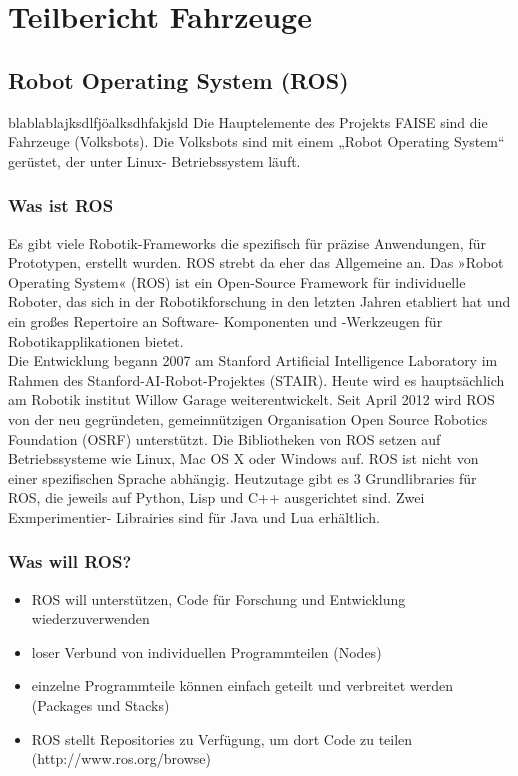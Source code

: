 \section{Teilbericht Fahrzeuge}
\subsection{Robot Operating System (ROS)}
blablablajksdlfjöalksdhfakjsld
Die Hauptelemente des Projekts FAISE sind die Fahrzeuge (Volksbots). Die Volksbots sind
mit einem „Robot Operating System“ gerüstet, der unter Linux- Betriebssystem läuft.
\subsubsection{Was ist ROS}
Es gibt viele Robotik-Frameworks die spezifisch für präzise Anwendungen, für Prototypen,
erstellt wurden. ROS strebt da eher das Allgemeine an. Das »Robot Operating System«
(ROS) ist ein Open-Source Framework für individuelle Roboter, das sich in der
Robotikforschung in den letzten Jahren etabliert hat und ein großes Repertoire an Software-
Komponenten und -Werkzeugen für Robotikapplikationen bietet.\\
Die Entwicklung begann 2007 am Stanford Artificial Intelligence Laboratory im Rahmen des
Stanford-AI-Robot-Projektes (STAIR). Heute wird es hauptsächlich am Robotik institut Willow
Garage weiterentwickelt. Seit April 2012 wird ROS von der neu gegründeten,
gemeinnützigen Organisation Open Source Robotics Foundation (OSRF) unterstützt. Die
Bibliotheken von ROS setzen auf Betriebssysteme wie Linux, Mac OS X oder Windows auf.
ROS ist nicht von einer spezifischen Sprache abhängig. Heutzutage gibt es 3 Grundlibraries
für ROS, die jeweils auf Python, Lisp und C++ ausgerichtet sind. Zwei Exmperimentier-
Librairies sind für Java und Lua erhältlich.
\subsubsection{Was will ROS?}
\begin{itemize}
 \item ROS will unterstützen, Code für Forschung und Entwicklung wiederzuverwenden
 \item loser Verbund von individuellen Programmteilen (Nodes)
 \item einzelne Programmteile können einfach geteilt und verbreitet werden (Packages und Stacks)
 \item ROS stellt Repositories zu Verfügung, um dort Code zu teilen \cite{ROS:2014:Online}
(http://www.ros.org/browse)
\end{itemize}
